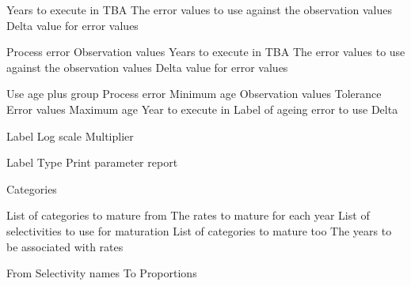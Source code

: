  {Years to execute in}
 {TBA}
 {The error values to use against the observation values}
 {Delta value for error values}
\par\textbf{}\par
{} {Process error}
 {Observation values}
 {Years to execute in}
 {TBA}
 {The error values to use against the observation values}
 {Delta value for error values}
\par\textbf{}\par
{} {Use age plus group}
 {Process error}
 {Minimum age}
 {Observation values}
 {Tolerance}
 {Error values}
 {Maximum age}
 {Year to execute in}
 {Label of ageing error to use}
 {Delta}
\par\textbf{}\par
{}\par\par
{} {Label}
 {Log scale}
 {Multiplier}
\par\par
{} {Label}
 {Type}
 {Print parameter report}
\par\textbf{}\par
{} {Categories}
\par\textbf{}\par
{} {List of categories to mature from}
 {The rates to mature for each year}
 {List of selectivities to use for maturation}
 {List of categories to mature too}
 {The years to be associated with rates}
\par\textbf{}\par
{} {From}
 {Selectivity names}
 {To}
 {Proportions}
\par\textbf{}\par
